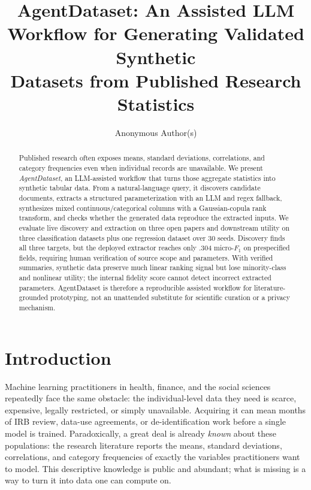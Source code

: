 \documentclass[letterpaper]{article} %
\title{AgentDataset: An Assisted LLM Workflow for Generating Validated Synthetic\\ Datasets from Published Research Statistics}
\author{
    Anonymous Author(s)
}
\begin{document}
\maketitle

\begin{abstract}
Published research often exposes means, standard deviations, correlations, and
category frequencies even when individual records are unavailable. We present
\emph{AgentDataset}, an LLM-assisted workflow that turns those aggregate
statistics into synthetic tabular data. From a natural-language query, it
discovers candidate documents, extracts a structured parameterization with an
LLM and regex fallback, synthesizes mixed continuous/categorical columns with a
Gaussian-copula rank transform, and checks whether the generated data reproduce
the extracted inputs. We evaluate live discovery and extraction on three open
papers and downstream utility on three classification datasets plus one
regression dataset over 30 seeds. Discovery finds all three targets, but the
deployed extractor reaches only .304 micro-$F_1$ on prespecified fields,
requiring human verification of source scope and parameters. With verified
summaries, synthetic data preserve much linear ranking signal but lose
minority-class and nonlinear utility; the internal fidelity score cannot detect
incorrect extracted parameters. AgentDataset is therefore a reproducible
assisted workflow for literature-grounded prototyping, not an unattended
substitute for scientific curation or a privacy mechanism.
\end{abstract}


\section{Introduction}

Machine learning practitioners in health, finance, and the social sciences
repeatedly face the same obstacle: the individual-level data they need is
scarce, expensive, legally restricted, or simply unavailable. Acquiring it can
mean months of IRB review, data-use agreements, or de-identification work
before a single model is trained. Paradoxically, a great deal is already
\emph{known} about these populations: the research literature reports the
means, standard deviations, correlations, and category frequencies of exactly
the variables practitioners want to model. This descriptive knowledge is public
and abundant; what is missing is a way to turn it into data one can compute on.
\end{document}
